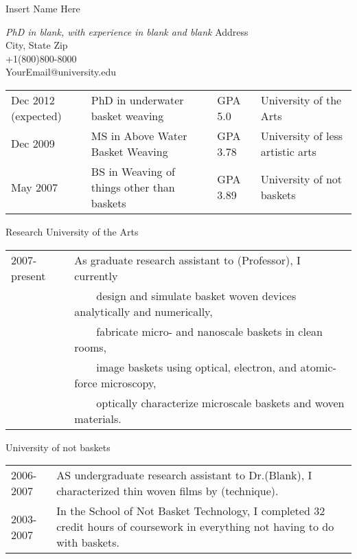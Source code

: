 \documentclass[a4paper]{article}
\newcommand{\name}[1]{\huge #1 \doublespacing}
\newcommand{\occupation}[1]{\vspace{0.125in}\large \textit{#1}}
\newcommand{\infor}[4]{\singlespacing \vspace{-1.2in} \flushright #1 \\ #2\\ \vspace{0.1in} #3 \\ #4 \flushleft \onehalfspacing}
\newcommand{\eduitem}[4]{#1 \hspace{10mm} & #2 & #3 \hspace{3mm} & #4}
\newcommand*{\bluebullet}{\textcolor{lucbullet}{$\blacksquare$}}
\newcommand{\tabitem}{~~\llap{\bluebullet}~~}
\renewcommand{\section}[2]{\LARGE #1 \hspace{0.95in} \large #2 \normalsize \vspace{0.25in}}
\begin{document}
\name{Insert Name Here}

\occupation{PhD in blank, with experience in blank and blank}
\small
\infor{Address}{City, State Zip}{+1(800)800-8000}{YourEmail@university.edu}

\normalsize
\vspace{5mm}
\begin{tabular}{l l l l}
	\eduitem{Dec 2012 (expected)}{PhD in underwater basket weaving}{GPA 5.0}{University of the Arts}\\ 
\eduitem{Dec 2009}{MS in Above Water Basket Weaving }{GPA 3.78}{University of less artistic arts}\\
\eduitem{May 2007}{BS in Weaving of things other than baskets }{GPA 3.89}{University of not baskets}
\end{tabular}
\vspace{0.5in}

\section{Research}{University of the Arts}

\begin{tabular}[t]{l@{\hspace{1.1in}} m{}}
	2007-present & As graduate research assistant to (Professor), I currently\\
	 	     & \tabitem design and simulate basket woven devices analytically and numerically,\\
		     & \tabitem fabricate micro- and nanoscale baskets in clean rooms,\\ 
		     & \tabitem image baskets using optical, electron, and atomic-force microscopy,\\
		     & \tabitem optically characterize microscale baskets and woven materials. 
\end{tabular}

\vspace{0.5in}

\section{}{\hspace{0.925in} University of not baskets}

\begin{tabular}[t]{l@{\hspace{1.25in}} m{}}
	2006-2007 & AS undergraduate research assistant to Dr.(Blank), I characterized thin woven films by (technique).\\
	2003-2007 & In the School of Not Basket Technology, I completed 32 credit hours of coursework in everything not having to do with baskets.
\end{tabular}
\end{document}
